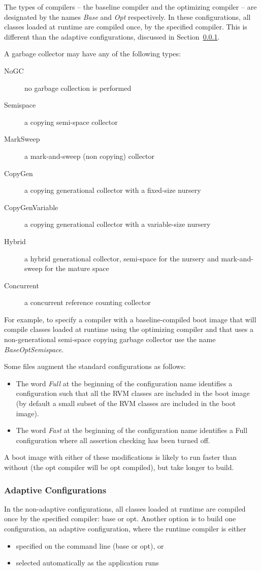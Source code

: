 The types of compilers -- the baseline compiler and 
the optimizing compiler -- are designated by the names {\em Base}
and {\em Opt} respectively.  In these configurations,
all classes loaded at runtime are compiled once, by the specified
compiler.  This is different than the adaptive configurations,
discussed in Section~\ref{adaptive-configs}.

A garbage collector may have any of the following types:

\begin{description}
\item[NoGC] no garbage collection is performed
\item[Semispace] a copying semi-space collector
\item[MarkSweep] a mark-and-sweep (non copying) collector
\item[CopyGen] a copying generational collector with a
fixed-size nursery
\item[CopyGenVariable] a copying generational collector with a
variable-size nursery
\item[Hybrid] a hybrid generational collector, semi-space for the
nursery and mark-and-sweep for the mature space
\item[Concurrent] a concurrent reference counting collector
\end{description}

For example, to specify a compiler with a baseline-compiled boot image
that will 
compile classes loaded at runtime using the optimizing compiler and that uses
a non-generational semi-space copying garbage collector use the name 
{\em BaseOptSemispace}.

Some files augment the standard configurations as follows:
\begin{itemize}
\item The word 
{\em Full} at the beginning of the configuration name identifies a 
configuration
such that all the RVM classes are included in the boot image (by default
a small subset of the RVM classes are included in the boot image). 
\item The word
{\em Fast} at the beginning of the configuration name identifies a Full
configuration where all assertion checking has been turned off. 
\end{itemize}
A boot image with
either of these modifications is likely to run faster than without
(the opt compiler will be opt compiled),
but take longer to build.  

\subsubsection{Adaptive Configurations} \label{adaptive-configs}
In the non-adaptive configurations, all classes
loaded at runtime are compiled once by the specified
compiler: base or opt.  Another option is to build one configuration,
an adaptive configuration,
where the runtime compiler is either
\begin{itemize}
\item specified on the command line (base or opt), or
\item selected automatically as the application runs
\end{itemize}

